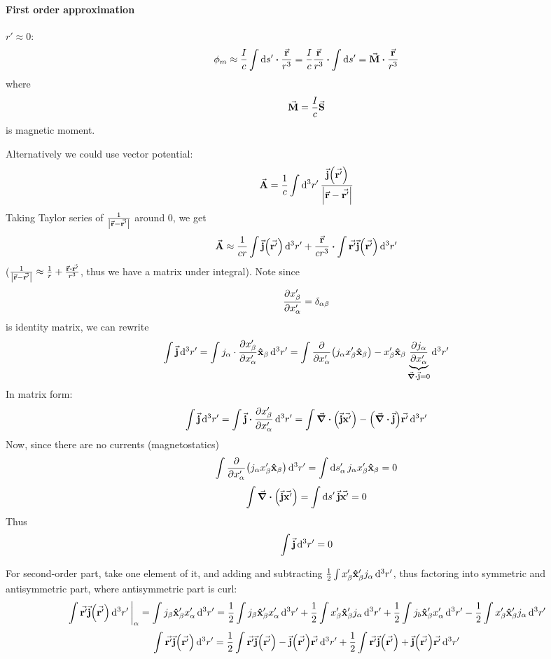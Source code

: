 \paragraph{First order approximation}
$r' \approx 0$:
$$\phi_m \approx \frac{I}{c} \int  \dd{s'} \vdot \frac{\va{r}}{r^3} = \frac{I}{c} \frac{\va{r}}{r^3}  \vdot  \int  \dd{s'} = \va{M} \vdot \frac{\va{r}}{r^3}$$
where
$$\va{M}= \frac{I}{c} \va{S}$$
is magnetic moment.

Alternatively we could use vector potential:
$$\va{A} = \frac{1}{c} \int \dd[3]{r'} \frac{\va{j}\qty(\va{r'})}{\abs{\va{r}-\va{r'}}}$$
Taking Taylor series of $\frac{1}{\abs{\va{r}-\va{r'}}}$ around 0, we get
$$\va{A} \approx \frac{1}{cr} \int \va{j}\qty(\va{r'}) \dd[3]{r'} +  \frac{\va{r}}{cr^3} \vdot \int \va{r'} \va{j}\qty(\va{r'}) \dd[3]{r'}$$
($\frac{1}{\abs{\va{r}-\va{r'}}} \approx \frac{1}{r} + \frac{\va{r}\vdot \va{r'}}{r^3}$, thus we have a matrix under integral).
Note since
$$\pdv{x'_\beta}{x'_\alpha} = \delta_{\alpha\beta}$$
is identity matrix, we can rewrite
$$\int \va{j} \dd[3]{r'} =\int j_\alpha \cdot \pdv{x'_\beta}{x'_\alpha} \vu{x}_\beta \dd[3]{r'} = \int \pdv{x'_\alpha}\qty(j_\alpha x'_\beta \vu{x}_\beta) - x'_\beta \vu{x}_\beta\underbrace{ \pdv{j_\alpha}{x'_\alpha}}_{\div{\va{j}} = 0}\dd[3]{r'}$$
In matrix form:
$$\int \va{j} \dd[3]{r'} =\int \va{j} \vdot \pdv{x'_\beta}{x'_\alpha} \dd[3]{r'} = \int \div(\va{j}\va{x'})  - \qty(\div{\va{j}} )\va{r'} \dd[3]{r'}$$
Now, since there are no currents (magnetostatics)
$$\int \pdv{x'_\alpha}\qty(j_\alpha x'_\beta \vu{x}_\beta) \dd[3]{r'} = \int \dd{s'_\alpha} j_\alpha x'_\beta \vu{x}_\beta = 0$$
$$ \int \div(\va{j}\va{x'})  =  \int \dd{s'} \va{j}\va{x'}  = 0$$
Thus
$$\int \va{j} \dd[3]{r'} =0$$


For second-order part, take one element of it, and adding and subtracting $\frac{1}{2} \int x'_\beta \vu{x}'_\beta j_\alpha \dd[3]{r'}$, thus factoring into symmetric and antisymmetric part, where antisymmetric part is curl:
$$ \eval{\int \va{r'} \va{j}\qty(\va{r'}) \dd[3]{r'}}_{\alpha} = \int j_\beta \vu{x}'_\beta x'_\alpha \dd[3]{r'} = \frac{1}{2} \int j_\beta \vu{x}'_\beta  x'_\alpha \dd[3]{r'} + \frac{1}{2} \int x'_\beta \vu{x}'_\beta j_\alpha \dd[3]{r'} + \frac{1}{2} \int j_b \vu{x}'_\beta x'_\alpha \dd[3]{r'} - \frac{1}{2} \int x'_\beta \vu{x}'_\beta j_\alpha \dd[3]{r'} $$
$$\int \va{r'} \va{j}\qty(\va{r'}) \dd[3]{r'} = \frac{1}{2}\int \va{r'} \va{j}\qty(\va{r'}) -\va{j}\qty(\va{r'})\va{r'}  \dd[3]{r'} + \frac{1}{2}\int \va{r'} \va{j}\qty(\va{r'}) +\va{j}\qty(\va{r'})\va{r'}  \dd[3]{r'}
$$